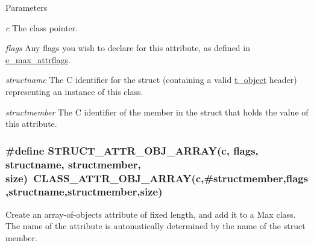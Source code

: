 \begin{DoxyParams}{Parameters}
\item[{\em c}]The class pointer. \item[{\em flags}]Any flags you wish to declare for this attribute, as defined in \hyperlink{group__attr_gaf296cfc6741bb19207f6ed8062809115}{e\_\-max\_\-attrflags}. \item[{\em structname}]The C identifier for the struct (containing a valid \hyperlink{structt__object}{t\_\-object} header) representing an instance of this class. \item[{\em structmember}]The C identifier of the member in the struct that holds the value of this attribute. \end{DoxyParams}
\hypertarget{group__attr_gac90347082cd6484c601e31b0ee43f56e}{
\subsubsection[{STRUCT\_\-ATTR\_\-OBJ\_\-ARRAY}]{\setlength{\rightskip}{0pt plus 5cm}\#define STRUCT\_\-ATTR\_\-OBJ\_\-ARRAY(c, \/  flags, \/  structname, \/  structmember, \/  size)~CLASS\_\-ATTR\_\-OBJ\_\-ARRAY(c,\#structmember,flags,structname,structmember,size)}}
\label{group__attr_gac90347082cd6484c601e31b0ee43f56e}


Create an array-\/of-\/objects attribute of fixed length, and add it to a Max class. The name of the attribute is automatically determined by the name of the struct member.


